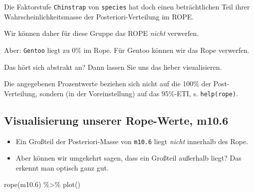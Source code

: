 \documentclass[
  a4paper,
  DIV=11]{scrreprt}
\newenvironment{Shaded}{\begin{snugshade}}{\end{snugshade}}
\newcommand{\FloatTok}[1]{\textcolor[rgb]{0.68,0.00,0.00}{#1}}
\newcommand{\FunctionTok}[1]{\textcolor[rgb]{0.28,0.35,0.67}{#1}}
\newcommand{\NormalTok}[1]{\textcolor[rgb]{0.00,0.23,0.31}{#1}}
\newcommand{\SpecialCharTok}[1]{\textcolor[rgb]{0.37,0.37,0.37}{#1}}
\providecommand{\tightlist}{%
  \setlength{\itemsep}{0pt}\setlength{\parskip}{0pt}}\usepackage{longtable,booktabs,array}
\theoremstyle{definition}
\theoremstyle{remark}
\begin{document}
Die Faktorstufe \texttt{Chinstrap} von \texttt{species} hat doch einen
beträchtlichen Teil ihrer Wahrscheinlichkeitsmasse der
Posteriori-Verteilung im ROPE.

Wir können daher für diese Gruppe das ROPE \emph{nicht} verwerfen.

Aber: \texttt{Gentoo} liegt zu 0\% im Rope. Für Gentoo können wir das
Rope verwerfen.

Das hört sich abstrakt an? Dann lassen Sie uns das lieber visualisieren.

\begin{tcolorbox}[enhanced jigsaw, colframe=quarto-callout-note-color-frame, title=\textcolor{quarto-callout-note-color}{\faInfo}\hspace{0.5em}{Hinweis}, breakable, leftrule=.75mm, coltitle=black, toptitle=1mm, bottomrule=.15mm, bottomtitle=1mm, opacityback=0, arc=.35mm, rightrule=.15mm, left=2mm, colbacktitle=quarto-callout-note-color!10!white, opacitybacktitle=0.6, toprule=.15mm, titlerule=0mm, colback=white]
Die angegebenen Prozentwerte beziehen sich nicht auf die 100\% der
Post-Verteilung, sondern (in der Voreinstellung) auf das 95\%-ETI, s.
\texttt{help(rope)}.
\end{tcolorbox}

\hypertarget{visualisierung-unserer-rope-werte-m10.6}{%
\subsection{Visualisierung unserer Rope-Werte,
m10.6}\label{visualisierung-unserer-rope-werte-m10.6}}

\begin{itemize}
\tightlist
\item
  Ein Großteil der Posteriori-Masse von \texttt{m10.6} liegt
  \emph{nicht} innerhalb des Rope.
\item
  Aber können wir umgekehrt sagen, dass ein Großteil außerhalb liegt?
  Das erkennt man optisch ganz gut.
\end{itemize}

\begin{Shaded}
\begin{Highlighting}[]
\FunctionTok{rope}\NormalTok{(m10}\FloatTok{.6}\NormalTok{) }\SpecialCharTok{\%\textgreater{}\%} \FunctionTok{plot}\NormalTok{()}
\end{Highlighting}
\end{Shaded}
\end{document}
